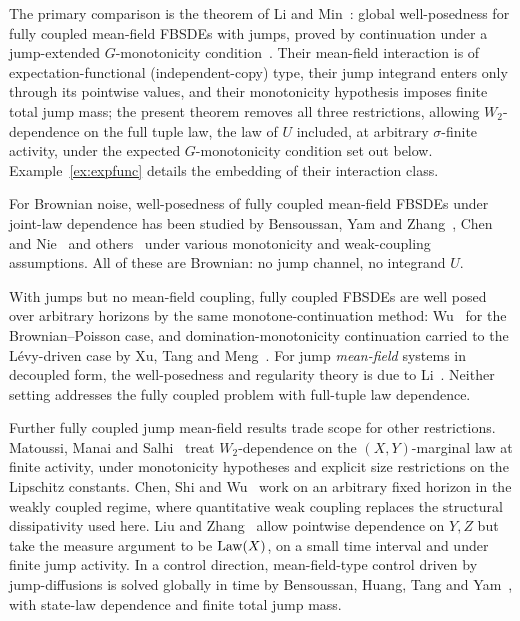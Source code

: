 The primary comparison is the theorem of Li and Min~\cite{LiMin}: global well-posedness
for fully coupled mean-field FBSDEs with jumps, proved by continuation under a
jump-extended $G$-monotonicity condition~\cite[(H3.2)]{LiMin}. Their mean-field
interaction is of expectation-functional (independent-copy) type, their jump integrand
enters only through its pointwise values, and their monotonicity hypothesis imposes
finite total jump mass; the present theorem removes all three restrictions, allowing
$W_2$-dependence on the full tuple law, the law of $U$ included, at arbitrary
$\sigma$-finite activity, under the expected $G$-monotonicity condition set out
below. Example~\ref{ex:expfunc} details the embedding of their interaction class.

For Brownian noise, well-posedness of fully coupled mean-field FBSDEs under joint-law
dependence has been studied by Bensoussan, Yam and Zhang~\cite{BYZ}, Chen and
Nie~\cite{ChenNie} and
others~\cite{CarmonaDelarueFBSDE,ChenNieWang,HuaLuo,MinPengQin,TianYu,WuHao,ZhangHuang}
under various monotonicity and weak-coupling assumptions. All of these are Brownian: no
jump channel, no integrand $U$.

With jumps but no mean-field coupling, fully coupled FBSDEs are well posed over arbitrary
horizons by the same monotone-continuation method: Wu~\cite{WuFBSDEP} for the
Brownian--Poisson case, and domination-monotonicity continuation carried to the
L\'evy-driven case by Xu, Tang and Meng~\cite{XuTangMeng}. For jump \emph{mean-field}
systems in decoupled form, the well-posedness and regularity theory is due to
Li~\cite{LiSPA18}. Neither setting addresses the fully coupled problem with full-tuple
law dependence.

Further fully coupled jump mean-field results trade scope for other restrictions.
Matoussi, Manai and Salhi~\cite{MMS} treat $W_2$-dependence on the $(X,Y)$-marginal law
at finite activity, under monotonicity hypotheses and explicit size restrictions on the
Lipschitz constants.
Chen, Shi and Wu~\cite{ChenShiWu} work on an arbitrary fixed horizon in the weakly
coupled regime, where quantitative weak coupling replaces the structural dissipativity
used here. Liu and Zhang~\cite{LiuZhang} allow pointwise dependence on $Y,Z$ but take the
measure argument to be $\mathrm{Law}(X)$, on a small time interval and under finite jump
activity. In a control direction, mean-field-type control driven by jump-diffusions is
solved globally in time by Bensoussan, Huang, Tang and Yam~\cite{BHTY}, with state-law
dependence and finite total jump mass.

